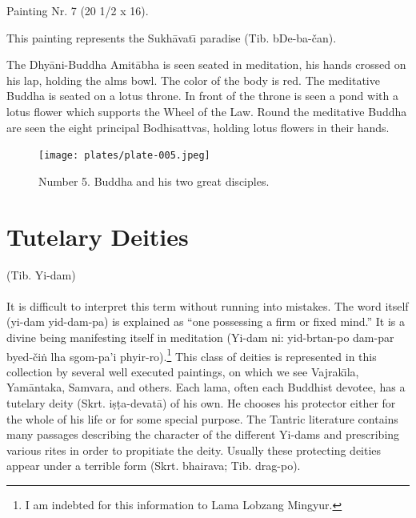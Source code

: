 \documentclass[a4paper, 12pt, oneside]{article}
\begin{document}
\bigskip

Painting Nr. 7 (20 1/2 x 16).

\bigskip

This painting represents the Sukh\={a}vat\={\i} paradise (Tib. bDe-ba-čan).

The Dhy\={a}ni-Buddha Amit\={a}bha is seen seated in meditation, his hands crossed on his lap, holding the alms bowl. The color of the body is red. The meditative Buddha is seated on a lotus throne. In front of the throne is seen a pond with a lotus flower which supports the Wheel of the Law. Round the meditative Buddha are seen the eight principal Bodhisattvas, holding lotus flowers in their hands. 

\clearpage
\vspace*{\fill}
\begin{figure}[H]
\centering
\texttt{[image: plates/plate-005.jpeg]}
\caption*{Number 5. Buddha and his two great disciples.}
\end{figure}
\vspace*{\fill}
\clearpage
\section{Tutelary Deities}
\begin{center}
(Tib. Yi-dam)
\end{center}
\paragraph{}
It is difficult to interpret this term without running into mistakes. The word itself (yi-dam yid-dam-pa) is explained as ``one possessing a firm or fixed mind.'' It is a divine being manifesting itself in meditation (Yi-dam ni: yid-brtan-po dam-par byed-či\.{n} lha sgom-pa'i phyir-ro).\footnote{I am indebted for this information to Lama Lobzang Mingyur.} This class of deities is represented in this collection by several well executed paintings, on which we see Vajrak\={\i}la, Yam\={a}ntaka, Samvara, and others. Each lama, often each Buddhist devotee, has a tutelary deity (Skrt. i\d{s}\d{t}a-devat\={a}) of his own. He chooses his protector either for the whole of his life or for some special purpose. The Tantric literature contains many passages describing the character of the different Yi-dams and prescribing various rites in order to propitiate the deity. Usually these protecting deities appear under a terrible form (Skrt. bhairava; Tib. drag-po).
\end{document}
